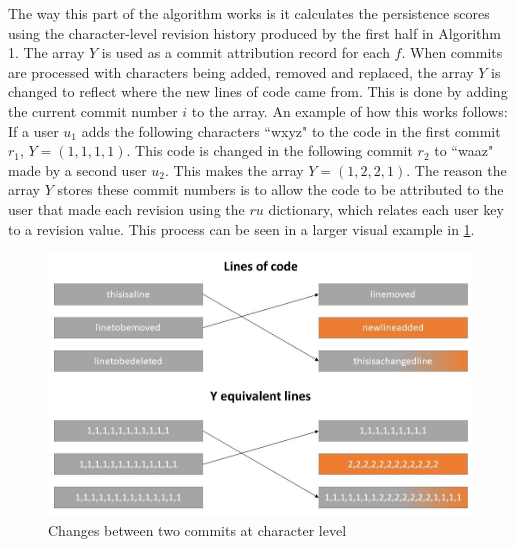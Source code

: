 The way this part of the algorithm works is it calculates the persistence scores using the character-level revision history produced by the first half in Algorithm 1. The array $Y$ is used as a commit attribution record for each $f$. When commits are processed with characters being added, removed and replaced, the array $Y$ is changed to reflect where the new lines of code came from. This is done by adding the current commit number $i$ to the array. An example of how this works follows:
If a user $u_1$ adds the following characters ``wxyz" to the code in the first commit $r_1$, $Y = (1,1,1,1)$. This code is changed in the following commit $r_2$ to ``waaz" made by a second user $u_2$. This makes the array $Y = (1,2,2,1)$. The reason the array $Y$ stores these commit numbers is to allow the code to be attributed to the user that made each revision using the $ru$ dictionary, which relates each user key to a revision value. This process can be seen in a larger visual example in \ref{fig:5}.
\begin{figure}[h]
    \centering
    \includegraphics[scale=0.5]{images/tracking_changes.jpg}
    \caption{Changes between two commits at character level}
    \label{fig:5}
\end{figure}

